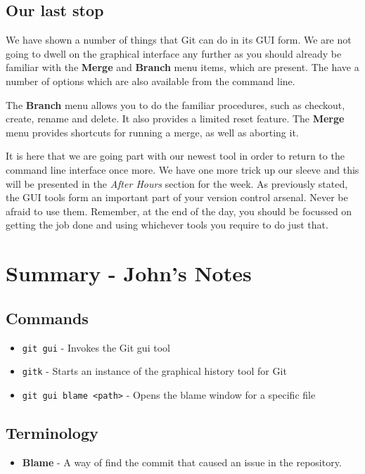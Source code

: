 \subsection{Our last stop}
We have shown a number of things that Git can do in its GUI form.
We are not going to dwell on the graphical interface any further as you should already be familiar with the \textbf{Merge} and \textbf{Branch} menu items, which are present.
The have a number of options which are also available from the command line.

The \textbf{Branch} menu allows you to do the familiar procedures, such as checkout, create, rename and delete.
It also provides a limited reset feature.
The \textbf{Merge} menu provides shortcuts for running a merge, as well as aborting it.

It is here that we are going part with our newest tool in order to return to the command line interface once more.
We have one more trick up our sleeve and this will be presented in the \emph{After Hours} section for the week.
As previously stated, the GUI tools form an important part of your version control arsenal.
Never be afraid to use them.
Remember, at the end of the day, you should be focussed on getting the job done and using whichever tools you require to do just that.

\clearpage

\section{Summary - John's Notes}
\subsection{Commands}
\begin{itemize}

\item\texttt{git gui} - Invokes the Git gui tool

\item\texttt{gitk} - Starts an instance of the graphical history tool for Git

\item\texttt{git gui blame <path>} - Opens the blame window for a specific file

\end{itemize}

\subsection{Terminology}
\begin{itemize}

\item\textbf{Blame} - A way of find the commit that caused an issue in the repository.
\end{itemize}
